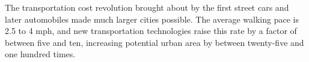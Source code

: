 The transportation cost revolution brought about by the first street cars and later automobiles made much larger cities possible.  The average walking pace is 2.5 to 4 mph, and new transportation technologies raise this rate by a factor of between five and ten, increasing potential urban area by between twenty-five and one hundred times. 











